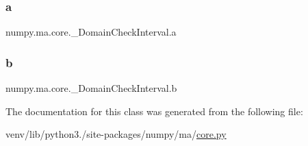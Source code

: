 \subsubsection{\texorpdfstring{a}{a}}
{\footnotesize\ttfamily numpy.\+ma.\+core.\+\_\+\+Domain\+Check\+Interval.\+a}

\mbox{\label{classnumpy_1_1ma_1_1core_1_1__DomainCheckInterval_ab4d56992d7a36ca81ddfb5439ad023db}} 
\subsubsection{\texorpdfstring{b}{b}}
{\footnotesize\ttfamily numpy.\+ma.\+core.\+\_\+\+Domain\+Check\+Interval.\+b}



The documentation for this class was generated from the following file\+:\begin{DoxyCompactItemize}
\item 
venv/lib/python3./site-\/packages/numpy/ma/\hyperlink{numpy_2ma_2core_8py}{core.\+py}\end{DoxyCompactItemize}
